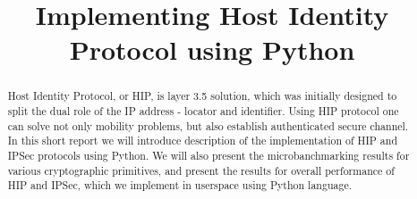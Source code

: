 \documentclass[conference,10pt,letter]{IEEEtran}
\begin{document}
\sloppy
\title{Implementing Host Identity Protocol using Python}
\maketitle
\begin{abstract}
Host Identity Protocol, or HIP, is layer 3.5 solution,
which was initially designed to split the dual role of
the IP address - locator and identifier. Using HIP protocol
one can solve not only mobility problems, but also 
establish authenticated secure channel. In this short 
report we will introduce description of the implementation
of HIP and IPSec protocols using Python. We will also present the 
microbanchmarking results for various cryptographic primitives,
and present the results for overall performance of HIP and IPSec,
which we implement in userspace using Python language.
\end{abstract}







\end{document}
